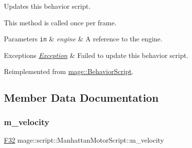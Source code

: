 Updates this behavior script.

This method is called once per frame.


\begin{DoxyParams}[1]{Parameters}
\mbox{\tt in}  & {\em engine} & A reference to the engine. \\
\hline
\end{DoxyParams}

\begin{DoxyExceptions}{Exceptions}
{\em \hyperlink{classmage_1_1_exception}{Exception}} & Failed to update this behavior script. \\
\hline
\end{DoxyExceptions}


Reimplemented from \hyperlink{classmage_1_1_behavior_script_a085634661326b59850c1111e537baa4e}{mage\+::\+Behavior\+Script}.



\subsection{Member Data Documentation}
\hypertarget{classmage_1_1script_1_1_manhattan_motor_script_a38cdef10269075f08f3fcdc9ed8bc520}{}\label{classmage_1_1script_1_1_manhattan_motor_script_a38cdef10269075f08f3fcdc9ed8bc520} 
\subsubsection{\texorpdfstring{m\+\_\+velocity}{m\_velocity}}
{\footnotesize\ttfamily \hyperlink{namespacemage_aa97e833b45f06d60a0a9c4fc22ae02c0}{F32} mage\+::script\+::\+Manhattan\+Motor\+Script\+::m\+\_\+velocity\hspace{0.3cm}{\ttfamily [private]}}

